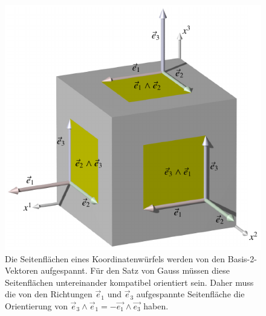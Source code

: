 %
%
%
\begin{figure}
\centering
\includegraphics{chapters/050-gauss/images/oberflaeche.pdf}
\caption{Die Seitenflächen eines Koordinatenwürfels werden von den
Basis-2-Vektoren aufgespannt.
Für den Satz von Gauss müssen diese Seitenflächen untereinander kompatibel
orientiert sein.
Daher muss die von den Richtungen $\vec{e}_1$ und $\vec{e}_3$ aufgespannte
Seitenfläche die Orientierung von
$\vec{e}_3\wedge\vec{e}_1=-\vec{e_1}\wedge\vec{e_3}$
haben.
\label{buch:gauss:fig:oberflaeche}}
\end{figure}
